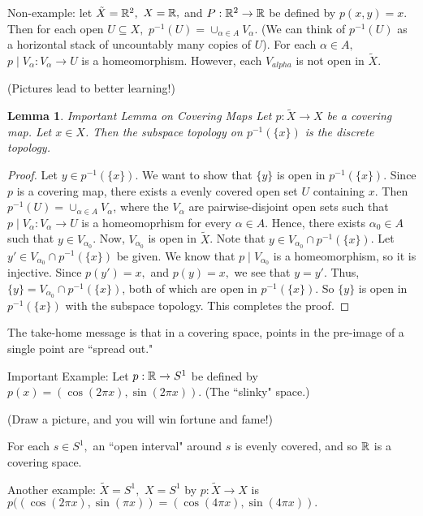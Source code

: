 \documentclass{amsart}
\newtheorem{lem}{Lemma}
\begin{document}
Non-example: let $\tilde{X}=\mathbb R^2,$ $X=\mathbb R,$ and $P:\mathbb R^2\rightarrow \mathbb R$ be defined by $p(x,y)=x$.  Then for each open $U \subseteq X,$ $p^{-1}(U)=\cup_{\alpha \in A}V_{\alpha}.$  (We can think of $p^{-1}(U)$ as a horizontal stack of uncountably many copies of $U$).  For each $\alpha \in A,$ $p \mid V_{\alpha}: V_{\alpha} \rightarrow U$ is a homeomorphism.  However, each $V_{alpha}$ is not open in $\tilde{X}$.  

(Pictures lead to better learning!)
\vspace{2 in}

\begin{lem}{Important Lemma on Covering Maps}
Let $p:\tilde{X} \rightarrow X$ be a covering map.  Let $x \in X$.  Then the subspace topology on $p^{-1}(\{x\})$ is the discrete topology.
\end{lem}

\begin{proof}Let $y \in p^{-1}(\{x\}).$  We want to show that $\{y\}$ is open in $p^{-1}(\{x\})$.  Since $p$ is a covering map, there exists a evenly covered open set $U$ containing $x$.  Then $p^{-1}(U)=\cup_{\alpha \in A}V_{\alpha}$, where the $V_{\alpha}$ are pairwise-disjoint open sets such that $p \mid V_{\alpha}:V_{\alpha}\rightarrow U$ is a homeomoprhism for every $\alpha \in A$.  Hence, there exists $\alpha_0 \in A$ such that $y \in V_{\alpha_0}$.  Now, $V_{\alpha_0}$ is open in $\tilde{X}$.  Note that $y \in V_{\alpha_0}\cap p^{-1}(\{x\})$.  Let $y' \in V_{\alpha_0} \cap p^{-1}(\{x\})$ be given.  We know that $p \mid V_{\alpha_0}$ is a homeomorphism, so it is injective.  Since $p(y')=x,$ and $p(y)=x,$ we see that $y=y'$.  Thus, $\{y\}=V_{\alpha_0} \cap p^{-1}(\{x\})$, both of which are open in $p^{-1}(\{x\}).$ So $\{y\}$ is open in $p^{-1}(\{x\})$ with the subspace topology.  This completes the proof.
\end{proof}

The take-home message is that in a covering space, points in the pre-image of a single point are ``spread out."

Important Example: Let $p:\mathbb R \rightarrow S^1$ be defined by $p(x)=(\cos(2 \pi x), \sin(2 \pi x))$.  (The ``slinky" space.)

(Draw a picture, and you will win fortune and fame!)
\vspace{2 in}

For each $s \in S^1,$ an ``open interval" around $s$ is evenly covered, and so $\mathbb R$ is a covering space.  

Another example: $\tilde{X}=S^1,$ $X=S^1$ by $p:\tilde{X} \rightarrow X$ is $p((\cos(2 \pi x), \sin(\pi x))=(\cos(4 \pi x), \sin(4 \pi x)).$  
\end{document}
